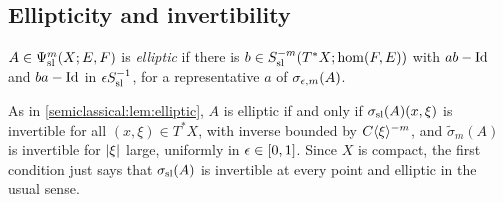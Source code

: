 \subsection{Ellipticity and invertibility}
\begin{definition}\label{semiclassical:def:elliptic-X}
  $A\in\Psi^{m}_{\mathrm{sl}}(X;E,F)$ is \emph{elliptic} if there is
  $b\in S^{-m}_{\mathrm{sl}}(T^*X;\hom(F,E))$ with $ab-\operatorname{Id}$ and $ba-\operatorname{Id}$ in $\epsilon S^{-1}_{\mathrm{sl}}$,
  for a representative $a$ of $\sigma_{\epsilon,m}(A)$.
\end{definition}

As in \cref{semiclassical:lem:elliptic}, $A$ is elliptic if and only if
$\sigma_{\mathrm{sl}}(A)(x,\xi)$ is invertible for all $(x,\xi)\in T^*X$, with inverse bounded by
$C\langle \xi\rangle^{-m}$, and $\tilde\sigma_m(A)$ is invertible for $\lvert \xi\rvert$ large, uniformly
in $\epsilon\in[0,1]$. Since $X$ is compact, the first condition just says that
$\sigma_{\mathrm{sl}}(A)$ is invertible at every point and elliptic in the usual sense.

